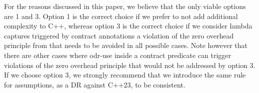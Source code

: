 For the reasons discussed in this paper, we believe that the only viable options are 1 and 3. Option 1 is the correct choice if we prefer to not add additional complexity to C++, whereas option 3 is the correct choice if we consider lambda captures triggered by contract annotations a violation of the zero overhead principle from \cite{P2932R2} that needs to be avoided in all possible cases. Note however that there are other cases where odr-use inside a contract predicate can trigger violations of the zero overhead principle that would not be addressed by option 3. If we choose option 3, we strongly recommend that we introduce the same rule for assumptions, as a DR against C++23, to be consistent.





\pagebreak

\renewcommand{\bibname}{References}




